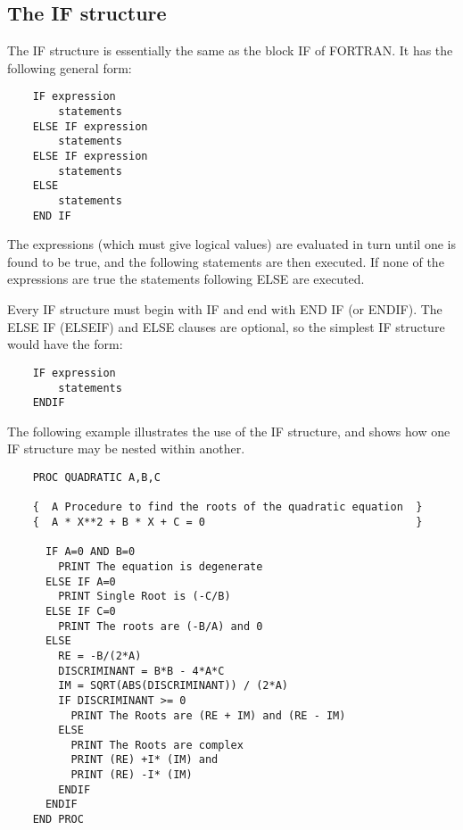 \subsection{The IF structure}
The IF structure is essentially the same as the block IF of FORTRAN. It
has the following general form:
\begin{verbatim}
    IF expression
        statements
    ELSE IF expression
        statements
    ELSE IF expression
        statements
    ELSE
        statements
    END IF
\end{verbatim}
The expressions (which must give logical values) are evaluated in turn until
one is found to be true, and the following statements are then executed.
If none of the expressions
are true the statements following ELSE are executed.

Every IF structure must begin with IF and end with END IF (or ENDIF). The
ELSE IF (ELSEIF) and ELSE clauses are optional, so the simplest IF structure
would have the form:
\begin{verbatim}
    IF expression
        statements
    ENDIF
\end{verbatim}
The following example illustrates the use of the IF structure, and shows how
one IF structure may be nested within another.
\begin{verbatim}
    PROC QUADRATIC A,B,C
    
    {  A Procedure to find the roots of the quadratic equation  }
    {  A * X**2 + B * X + C = 0                                 }
    
      IF A=0 AND B=0
        PRINT The equation is degenerate
      ELSE IF A=0
        PRINT Single Root is (-C/B)
      ELSE IF C=0
        PRINT The roots are (-B/A) and 0
      ELSE
        RE = -B/(2*A)
        DISCRIMINANT = B*B - 4*A*C
        IM = SQRT(ABS(DISCRIMINANT)) / (2*A)
        IF DISCRIMINANT >= 0
          PRINT The Roots are (RE + IM) and (RE - IM)
        ELSE
          PRINT The Roots are complex
          PRINT (RE) +I* (IM) and
          PRINT (RE) -I* (IM)
        ENDIF
      ENDIF
    END PROC
\end{verbatim}
